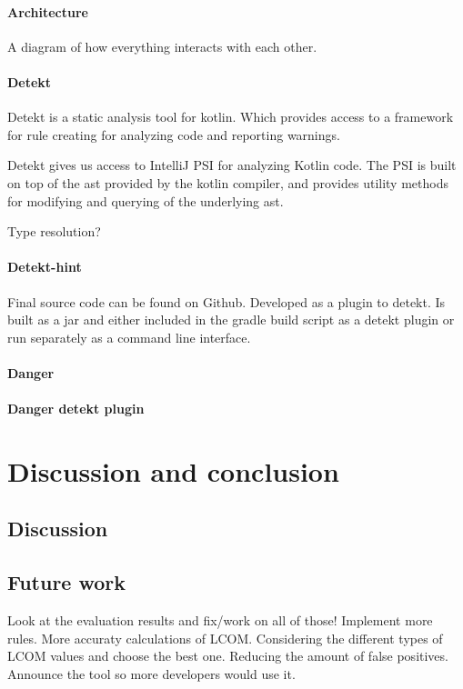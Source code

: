 \documentclass{report}
\begin{document}
\subsubsection{Architecture}
A diagram of how everything interacts with each other.

\subsubsection{Detekt}
Detekt is a static analysis tool for kotlin. Which provides access to a framework for rule creating for analyzing code and reporting warnings.

Detekt gives us access to IntelliJ PSI for analyzing Kotlin code. The PSI is built on top of the \gls{ast} provided by the kotlin compiler, and provides utility methods for modifying and querying of the underlying \gls{ast}.

Type resolution?

\subsubsection{Detekt-hint}
Final source code can be found on Github\cite{detekt-hint-repository}. Developed as a plugin to detekt. Is built as a jar and either included in the gradle build script as a detekt plugin or run separately as a command line interface.

\subsubsection{Danger}

\subsubsection{Danger detekt plugin}

\chapter{Discussion and conclusion}
\label{discussion}

\section{Discussion}

\section{Future work}
Look at the evaluation results and fix/work on all of those! 
Implement more rules. More accuraty calculations of LCOM. Considering the different types of LCOM values and choose the best one.
Reducing the amount of false positives.
Announce the tool so more developers would use it.
\end{document}
